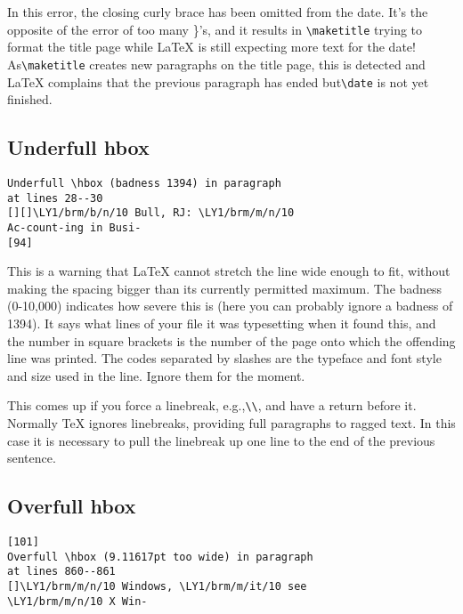 In this error, the closing curly brace has been omitted from the date. It's the
opposite of the error of too many \}'s, and it results in \verb|\maketitle|
trying to format the title page while LaTeX is still expecting more text for
the date! As\verb|\maketitle| creates new paragraphs on the title page, this is
detected and LaTeX complains that the previous paragraph has ended
but\verb|\date| is not yet finished.

\subsection{Underfull hbox}
\begin{verbatim}
Underfull \hbox (badness 1394) in paragraph
at lines 28--30
[][]\LY1/brm/b/n/10 Bull, RJ: \LY1/brm/m/n/10
Ac-count-ing in Busi-
[94]

\end{verbatim}

This is a warning that LaTeX cannot stretch the line wide enough to fit,
without making the spacing bigger than its currently permitted maximum. The
badness (0-10,000) indicates how severe this is (here you can probably ignore a
badness of 1394). It says what lines of your file it was typesetting when it
found this, and the number in square brackets is the number of the page onto
which the offending line was printed. The codes separated by slashes are the
typeface and font style and size used in the line. Ignore them for the moment. 

This comes up if you force a linebreak, e.g.,\verb|\\|, and have a return
before it. Normally TeX ignores linebreaks, providing full paragraphs to ragged
text. In this case it is necessary to pull the linebreak up one line to the end
of the previous sentence.

\subsection{Overfull hbox}
\begin{verbatim}
[101]
Overfull \hbox (9.11617pt too wide) in paragraph
at lines 860--861
[]\LY1/brm/m/n/10 Windows, \LY1/brm/m/it/10 see
\LY1/brm/m/n/10 X Win-
\end{verbatim}

